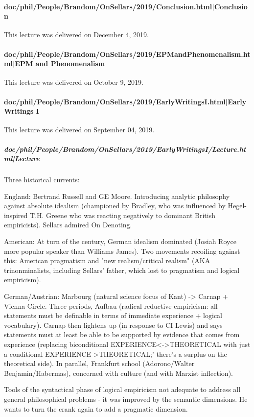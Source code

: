 \documentclass[12pt,a4paper]{report}
\begin{document}
\paragraph{doc/phil/People/Brandom/OnSellars/2019/Conclusion.html|Conclusion}
This lecture was delivered on December 4, 2019.

\paragraph{doc/phil/People/Brandom/OnSellars/2019/EPMandPhenomenalism.html|EPM and Phenomenalism}
This lecture was delivered on October 9, 2019.

\paragraph{doc/phil/People/Brandom/OnSellars/2019/EarlyWritingsI.html|Early Writings I}
This lecture was delivered on September 04, 2019.

\subparagraph{doc/phil/People/Brandom/OnSellars/2019/EarlyWritingsI/Lecture.html|Lecture}

Three historical currents:

England: Bertrand Russell and GE Moore. Introducing analytic philosophy against absolute idealism (championed by Bradley, who was influenced by Hegel-inspired T.H. Greene who was reacting negatively to dominant British empiricists). Sellars admired On Denoting.

American: At turn of the century, German idealism dominated (Josiah Royce more popular speaker than Williams James). Two movements recoiling against this: American pragmatism and "new realism/critical realism" (AKA trinonminalists, including Sellars' father, which lost to pragmatism and logical empiricism).

German/Austrian: Marbourg (natural science focus of Kant) -> Carnap + Vienna Circle. Three periods, Aufbau (radical reductive empiricism: all statements must be definable in terms of immediate experience + logical vocabulary). Carnap then lightens up (in response to CI Lewis) and says statements must at least be able to be supported by evidence that comes from experience (replacing biconditional EXPERIENCE<->THEORETICAL with just a conditional EXPERIENCE->THEORETICAL;' there's a surplus on the theoretical side).
In parallel, Frankfurt school (Adorono/Walter Benjamin/Habermas), concerned with culture (and with Marxist inflection).

Tools of the syntactical phase of logical empiricism not adequate to address all general philosophical problems - it was improved by the semantic dimensions. He wants to turn the crank again to add a pragmatic dimension.
\end{document}
